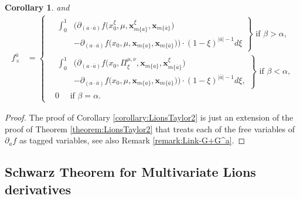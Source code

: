 \documentclass[a4paper,11pt,twoside]{article}
\numberwithin{equation}{section}
\theoremstyle{plain}
\newtheorem{corollary}[theorem]{Corollary}
\newcommand{\1}{\mathbbm{1}}
\begin{document}
\begin{corollary}
		and
		\begin{align*}
			f_{\times}^{\overline{a}}
			&=\left\{ 
			\begin{aligned}
				&\left.
				\begin{aligned}
					\int_0^1& \bigg( \partial_{(a\cdot \overline{a})} f \Big(x_0^{\xi}, \mu, \boldsymbol{x}_{m\{a\}}^{\xi}, \boldsymbol{x}_{m\{\overline{a}\}} \Big) 
					\\
					&- \partial_{(a\cdot \overline{a})} f \Big(x_0, \mu, \boldsymbol{x}_{m\{a\}}, \boldsymbol{x}_{m\{\overline{a}\}} \Big)\bigg) \cdot (1-\xi)^{|\overline{a}|-1} d\xi
				\end{aligned} \right\} \mbox{ if $\beta>\alpha$,}
				\\
				&\left.
				\begin{aligned}
					\int_0^1& \bigg( \partial_{(a\cdot \overline{a})} f \Big(x_0, \Pi^{\mu, \nu}_\xi, \boldsymbol{x}_{m\{a\}}, \boldsymbol{x}_{m\{\overline{a}\}}^{\xi} \Big) 
					\\
					&- \partial_{(a\cdot \overline{a})} f \Big(x_0, \mu, \boldsymbol{x}_{m\{a\}}, \boldsymbol{x}_{m\{\overline{a}\}} \Big)\bigg) \cdot (1-\xi)^{|\overline{a}|-1} d\xi,
				\end{aligned} \right\} \mbox{ if $\beta<\alpha$,}
				\\
				&0 \quad \mbox{ if $\beta=\alpha$.}
			\end{aligned}\right.
		\end{align*}
	\end{corollary}
	
	\begin{proof}
		The proof of Corollary \ref{corollary:LionsTaylor2} is just an extension of the proof of Theorem \ref{theorem:LionsTaylor2} that treats each of the free variables of $\partial_a f$ as tagged variables, see also Remark \ref{remark:Link-G+G^a}. 
	\end{proof}
	
	\subsection{Schwarz Theorem for Multivariate Lions derivatives}
	
	
	
\end{document}

